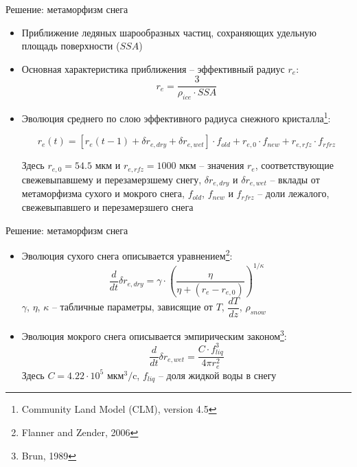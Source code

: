 \documentclass[unicode]{beamer}
\begin{document}
\begin{frame}{Решение: метаморфизм снега}

\scriptsize

\begin{itemize}
        \item Приближение ледяных шарообразных частиц, сохраняющих удельную площадь поверхности ($SSA$) 

        \item Основная характеристика приближения -- эффективный радиус $r_e$:
            \[ r_e = \dfrac{3} {\rho_{ice} \cdot SSA} \label{sys} \]
        \item Эволюция среднего по слою эффективного радиуса снежного кристалла\footnote{\scriptsize Community Land Model (CLM), version 4.5}:
        \footnotesize
        \begin{block}{}  
            \[ r_e(t) = [r_e (t - 1) + \delta r_{e , dry} + \delta r_{e , wet} ] \cdot f_{old} + r_{e ,0} \cdot f_{new} + r_{e , rfz} \cdot f_{rfrz} \]
        \end{block}    
        \scriptsize
        Здесь $ r_{e ,0} = 54.5 $ мкм и $r_{e , rfz} = 1000 $ мкм -- значения $r_e$, соответствующие свежевыпавшему и перезамерзшему снегу, $\delta r_{e , dry}$ и $\delta r_{e , wet}$ -- вклады от метаморфизма сухого и мокрого снега, $f_{old}$, $f_{new}$ и $f_{rfrz}$ -- доли лежалого, свежевыпавшего и перезамерзшего снега
\end{itemize}



\end{frame}



\begin{frame}{Решение: метаморфизм снега}

\footnotesize

\begin{itemize}
    \item Эволюция сухого снега описывается уравнением\footnote{\scriptsize Flanner and Zender, 2006}:
    \footnotesize
    \[ \dfrac{d}{dt} \delta r_{e , dry} = \gamma \cdot \left(\dfrac{\eta}{\eta + (r_e - r_{e, 0})}\right)^{1 / \kappa} \]
    $\gamma$, $\eta$, $\kappa$ -- табличные параметры, зависящие от $T$, $\dfrac{dT}{dz}$, $\rho_{snow}$

    \item Эволюция мокрого снега описывается эмпирическим законом\footnote{\scriptsize Brun, 1989}:
    \footnotesize
    \[ \dfrac{d}{dt} \delta r_{e , wet} = \dfrac{C \cdot f_{liq}^3} {4 \pi r_{e}^2} \]
    Здесь $C = 4.22 \cdot 10^{5}$ мкм$^3/$c, $f_{liq}$ -- доля жидкой воды в снегу
\end{itemize}

\end{frame}
\end{document}
